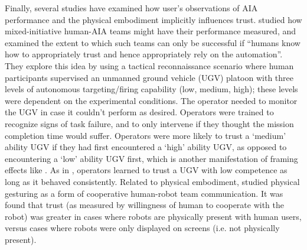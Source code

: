 Finally, several studies have examined how user's observations of AIA performance and the physical embodiment implicitly influences trust. %
\citet{Freedy2007-sg} studied how mixed-initiative human-AIA teams might have their performance measured, and examined the extent to which such teams can only be successful if ``humans know how to appropriately trust and hence appropriately rely on the automation''. 
They explore this idea by using a tactical reconnaissance scenario where human participants supervised an unmanned ground vehicle (UGV)  platoon with three levels of autonomous targeting/firing capability (low, medium, high); these levels were dependent on the experimental conditions. The operator needed to monitor the UGV in case it couldn't perform as desired.
Operators were trained to recognize signs of task failure, and to only intervene if they thought the mission completion time would suffer. %
Operators were more likely to trust a `medium' ability UGV if they had first encountered a `high' ability UGV, as opposed to encountering a `low' ability UGV first, which is another manifestation of framing effects like \cite{Riley1996-qm}. %
As in \cite{Muir1996-gt}, operators learned to trust a UGV with low competence as long as it behaved consistently. 
Related to physical embodiment, \citet{Bainbridge2011-pl} studied physical gesturing as a form of cooperative human-robot team communication.  It was found that trust (as measured by willingness of human to cooperate with the robot) was greater in cases where robots are physically present with human users, versus cases where robots were only displayed on screens (i.e. not physically present). 
